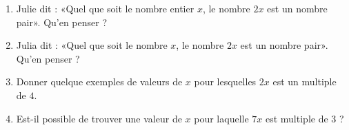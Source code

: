 
\begin{exercice}\label{exosmath-0938}

    \begin{enumerate}
        \item
            Julie dit : «Quel que soit le nombre entier \( x\), le nombre \( 2x\) est un nombre pair». Qu'en penser ?
        \item
            Julia dit : «Quel que soit le nombre \( x\), le nombre \( 2x\) est un nombre pair». Qu'en penser ?
        \item        
            Donner quelque exemples de valeurs de \( x\) pour lesquelles \( 2x\) est un multiple de \( 4\).
        \item
            Est-il possible de trouver une valeur de \( x\) pour laquelle \( 7x\) est multiple de \( 3\) ?
    \end{enumerate}

\end{exercice}
